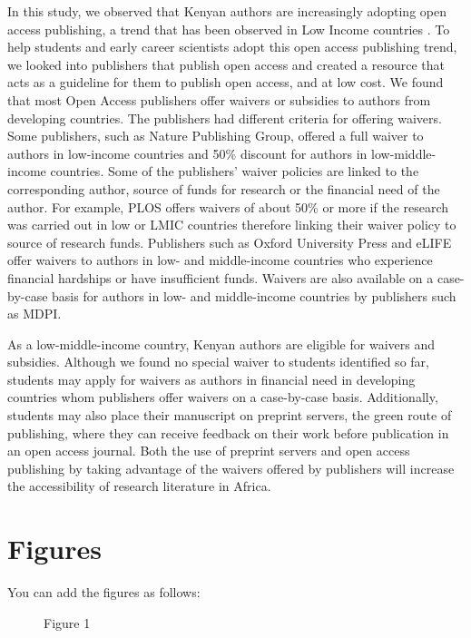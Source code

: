 In this study, we observed that Kenyan authors are increasingly adopting
open access publishing, a trend that has been observed in Low Income
countries \cite{iyandemye_low_2019}. To help students and early career
scientists adopt this open access publishing trend, we looked into
publishers that publish open access and created a resource that acts as
a guideline for them to publish open access, and at low cost. We found
that most Open Access publishers offer waivers or subsidies to authors
from developing countries. The publishers had different criteria for
offering waivers. Some publishers, such as Nature Publishing Group,
offered a full waiver to authors in low-income countries and 50\%
discount for authors in low-middle-income countries. Some of the
publishers' waiver policies are linked to the corresponding author,
source of funds for research or the financial need of the author. For
example, PLOS offers waivers of about 50\% or more if the research was
carried out in low or LMIC countries therefore linking their waiver
policy to source of research funds. Publishers such as Oxford University
Press and eLIFE offer waivers to authors in low- and middle-income
countries who experience financial hardships or have insufficient funds.
Waivers are also available on a case-by-case basis for authors in low-
and middle-income countries by publishers such as MDPI.

As a low-middle-income country, Kenyan authors are eligible for waivers
and subsidies. Although we found no special waiver to students
identified so far, students may apply for waivers as authors in
financial need in developing countries whom publishers offer waivers on
a case-by-case basis. Additionally, students may also place their
manuscript on preprint servers, the green route of publishing, where
they can receive feedback on their work before publication in an open
access journal. Both the use of preprint servers and open access
publishing by taking advantage of the waivers offered by publishers will
increase the accessibility of research literature in Africa.

\section*{Figures}\label{figures}

You can add the figures as follows:

\begin{figure}[htbp]
\centering
\caption{Figure 1}
\end{figure}


